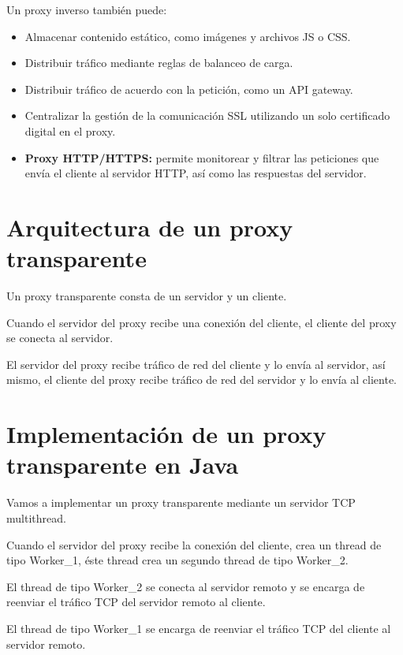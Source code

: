 Un proxy inverso también puede:

\begin{itemize}

\item Almacenar contenido estático, como imágenes y archivos JS o CSS.

\item Distribuir tráfico mediante reglas de balanceo de carga.

\item Distribuir tráfico de acuerdo con la petición, como un API gateway.

\item Centralizar la gestión de la comunicación SSL utilizando un solo certificado digital en el proxy.

\item \textbf{Proxy HTTP/HTTPS:} permite monitorear y filtrar las peticiones que envía el cliente al servidor HTTP, así como las respuestas del servidor.

\end{itemize}

\section{Arquitectura de un proxy transparente}

Un proxy transparente consta de un servidor y un cliente.

Cuando el servidor del proxy recibe una conexión del cliente, el cliente del proxy se conecta al servidor.

El servidor del proxy recibe tráfico de red del cliente y lo envía al servidor, así mismo, el cliente del proxy recibe tráfico de red del servidor y lo envía al cliente.

\section{Implementación de un proxy transparente en Java}

Vamos a implementar un proxy transparente mediante un servidor TCP multithread.

Cuando el servidor del proxy recibe la conexión del cliente, crea un thread de tipo Worker\_1, éste thread crea un segundo thread de tipo Worker\_2.

El thread de tipo Worker\_2 se conecta al servidor remoto y se encarga de reenviar el tráfico TCP del servidor remoto al cliente.

El thread de tipo Worker\_1 se encarga de reenviar el tráfico TCP del cliente al servidor remoto.

